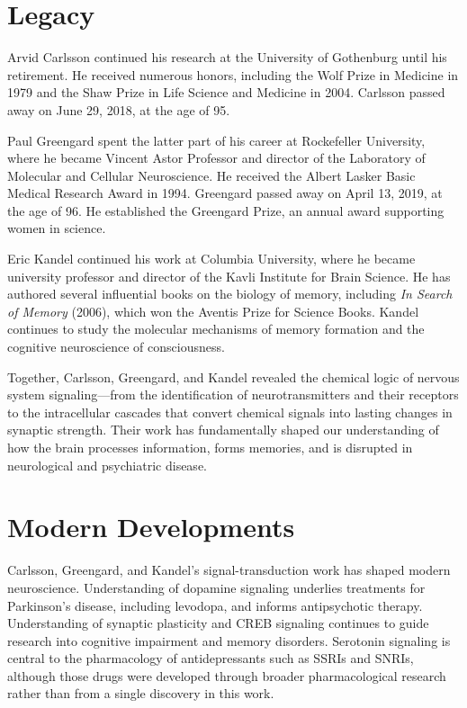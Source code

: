 \section{Legacy}

Arvid Carlsson continued his research at the University of Gothenburg until his retirement. He received numerous honors, including the Wolf Prize in Medicine in 1979 and the Shaw Prize in Life Science and Medicine in 2004. Carlsson passed away on June 29, 2018, at the age of 95.

Paul Greengard spent the latter part of his career at Rockefeller University, where he became Vincent Astor Professor and director of the Laboratory of Molecular and Cellular Neuroscience. He received the Albert Lasker Basic Medical Research Award in 1994. Greengard passed away on April 13, 2019, at the age of 96. He established the Greengard Prize, an annual award supporting women in science.

Eric Kandel continued his work at Columbia University, where he became university professor and director of the Kavli Institute for Brain Science. He has authored several influential books on the biology of memory, including \textit{In Search of Memory} (2006), which won the Aventis Prize for Science Books. Kandel continues to study the molecular mechanisms of memory formation and the cognitive neuroscience of consciousness.

Together, Carlsson, Greengard, and Kandel revealed the chemical logic of nervous system signaling---from the identification of neurotransmitters and their receptors to the intracellular cascades that convert chemical signals into lasting changes in synaptic strength. Their work has fundamentally shaped our understanding of how the brain processes information, forms memories, and is disrupted in neurological and psychiatric disease.


\section{Modern Developments}

Carlsson, Greengard, and Kandel's signal-transduction work has shaped modern neuroscience. Understanding of dopamine signaling underlies treatments for Parkinson's disease, including levodopa, and informs antipsychotic therapy. Understanding of synaptic plasticity and CREB signaling continues to guide research into cognitive impairment and memory disorders. Serotonin signaling is central to the pharmacology of antidepressants such as SSRIs and SNRIs, although those drugs were developed through broader pharmacological research rather than from a single discovery in this work.


